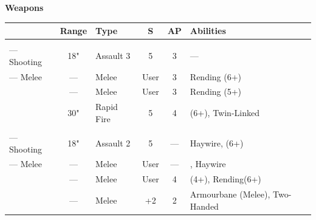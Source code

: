 \begin{minipage}[t]{0.72\textwidth}
	\vspace*{2em}
	\textbf{Weapons}
	
	\begin{tabular}{L{90 pt} c C{40pt} *{2}{c} >{\raggedright\arraybackslash}p{130pt}}
		& Range & Type & S & AP & Abilities \\
		\hline
		 & & &  &  &  \\
		— Shooting & 18" & Assault 3 & 5 & 3 & — \\
		— Melee & — & Melee & User & 3 & Rending (6+) \\
		 & — & Melee & User & 3 & Rending (5+) \\
		 & 30" & Rapid Fire & 5 & 4 &  (6+), Twin-Linked \\	
		 & & &  &  &  \\
		— Shooting & 18" & Assault 2 & 5 & — & Haywire,  (6+) \\
		— Melee & — & Melee & User & — & , Haywire \\
		 & — & Melee & User & 4 &  (4+), Rending(6+) \\
		 & — & Melee & +2 & 2 & Armourbane (Melee), Two-Handed \\
	\end{tabular}
	

\end{minipage}
